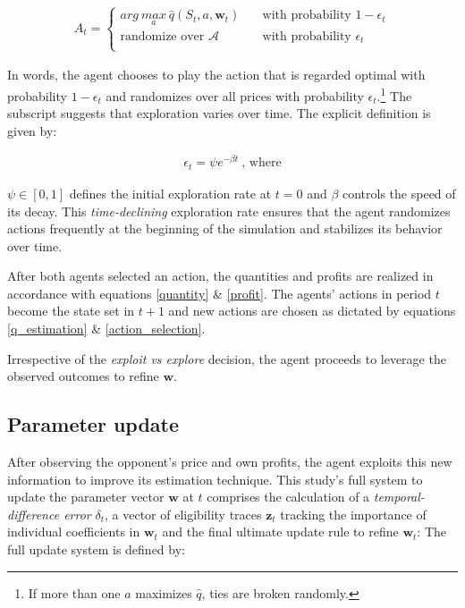 \begin{gather}\label{action_selection}
 A_t = \begin{cases} arg ~\underset{a}{max} ~ \hat{q}(S_t,a,\boldsymbol{w}_t) & \quad \text{with probability } 1 - \epsilon_t\\
\text{randomize over } \mathcal{A} & \quad \text{with probability } \epsilon_t\\ \end{cases} 
\end{gather}

In words, the agent chooses to play the action that is regarded optimal with probability $1-\epsilon_t$ and randomizes over all prices with probability $\epsilon_t$.\footnote{If more than one $a$ maximizes $\hat{q}$, ties are broken randomly.} The subscript suggests that exploration varies over time. The explicit definition is given by:

\begin{gather}
	\epsilon_t = \psi e^{-\beta t}~ \text{, where}
\end{gather}

$\psi \in [0, 1]$ defines the initial exploration rate at $t = 0$ and $\beta$ controls the speed of its decay. This \emph{time-declining} exploration rate ensures that the agent randomizes actions frequently at the beginning of the simulation and stabilizes its behavior over time. 

After both agents selected an action, the quantities and profits are realized in accordance with equations \ref{quantity} \& \ref{profit}. The agents' actions in period $t$ become the state set in $t+1$ and new actions are chosen as dictated by equations \ref{q_estimation} \& \ref{action_selection}.

Irrespective of the \emph{exploit vs explore} decision, the agent proceeds to leverage the observed outcomes to refine $\boldsymbol{w}$.



\subsection{Parameter update}

After observing the opponent's price and own profits, the agent exploits this new information to improve its estimation technique. This study's full system to update the parameter vector $\boldsymbol{w}$ at $t$ comprises the calculation of a \emph{temporal-difference error} $\delta_t$, a vector of eligibility traces $\boldsymbol{z}_t$ tracking the importance of individual coefficients in $\boldsymbol{w}_t$ and the final ultimate update rule to refine $\boldsymbol{w}_t$: The full update system is defined by:

